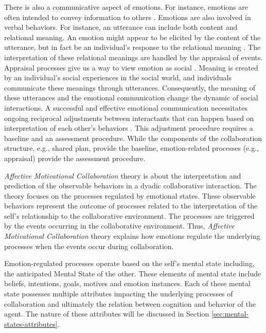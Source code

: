 \documentclass[12pt]{report}
\begin{document}
There is also a communicative aspect of emotions. For instance, emotions are
often intended to convey information to others \cite{goffman:self-presentation}.
Emotions are also involved in verbal behaviors. For instance, an utterance can
include both content and relational meaning. An emotion might appear to be
elicited by the content of the utterance, but in fact be an individual's
response to the relational meaning \cite{planalp:communicating-emotion}. The
interpretation of these relational meanings are handled by the appraisal of
events. Appraisal processes give us a way to view emotion as social
\cite{hooft:sharing-emotions}. Meaning is created by an individual's social
experiences in the social world, and individuals communicate these meanings
through utterances. Consequently, the meaning of these utterances and the
emotional communication change the dynamic of social interactions. A successful
and effective emotional communication necessitates ongoing reciprocal
adjustments between interactants that can happen based on interpretation of each
other's behaviors \cite{parkinson:emotion-social-interaction}. This adjustment
procedure requires a baseline and an assessment procedure. While the components
of the collaboration structure, e.g., shared plan, provide the baseline,
emotion-related processes (e.g., appraisal) provide the assessment procedure.

\textit{Affective Motivational Collaboration} theory is about the interpretation
and prediction of the observable behaviors in a dyadic collaborative
interaction. The theory focuses on the processes regulated by emotional states.
These observable behaviors represent the outcome of processes related to the
interpretation of the self's relationship to the collaborative environment.
The processes are triggered by the events occurring in the collaborative
environment. Thus, \textit{Affective Motivational Collaboration} theory explains
how emotions regulate the underlying processes when the events occur during
collaboration.

Emotion-regulated processes operate based on the self's mental state including,
the anticipated Mental State of the other. These elements of mental state
include beliefs, intentions, goals, motives and emotion instances. Each of these
mental state possesses multiple attributes impacting the underlying processes of
collaboration and ultimately the relation between cognition and behavior of the
agent. The nature of these attributes will be discussed in Section
\ref{sec:mental-states-attributes}.
\end{document}

